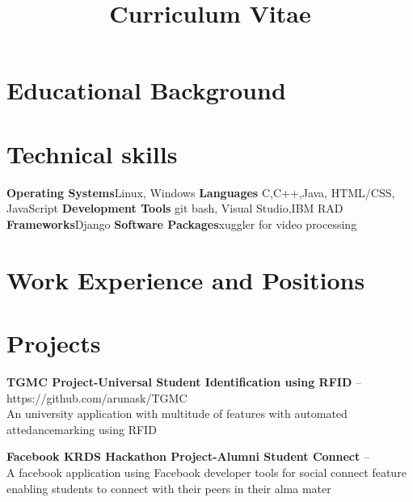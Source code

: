 \documentclass[11pt,a4paper]{moderncv}
\title{Curriculum Vitae}
\begin{document}
\maketitle

\section{Educational Background}

\section{Technical skills}
\cvcomputer
{\textbf{Operating Systems}}{Linux, Windows}
{\textbf{ Languages }}{    C,C++,Java, HTML/CSS, JavaScript}
\cvcomputer
{\textbf{Development Tools}}{ git bash, Visual Studio,IBM RAD}
{\textbf{Frameworks}}{Django}
\cvcomputer
{\textbf{Software Packages}}{xuggler for video processing}
{}{}


\section{Work Experience and Positions}




\pagebreak
\section{Projects}

\cvlistitem
{\textbf{TGMC Project-Universal Student Identification using RFID} -- {\small https://github.com/arunask/TGMC}
  \\An university application with multitude of features with automated attedancemarking using RFID\\
}

\cvlistitem
{\textbf{Facebook KRDS Hackathon Project-Alumni Student Connect} -- 
  \\A facebook application using Facebook developer tools for social connect feature enabling students to connect with their peers in their alma mater \\
}
\end{document}
